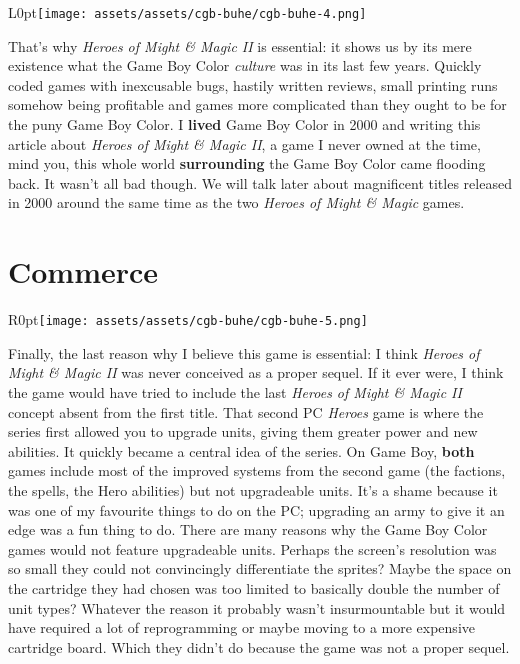 \documentclass{book}
\begin{document}
\begin{wrapfigure}{L}{0pt}{\texttt{[image: assets/assets/cgb-buhe/cgb-buhe-4.png]}}\end{wrapfigure}\noindent
That’s why \emph{Heroes of Might \& Magic II} is essential: it shows us by its mere existence what the Game Boy Color \emph{culture} was in its last few years. Quickly coded games with inexcusable bugs, hastily written reviews, small printing runs somehow being profitable and games more complicated than they ought to be for the puny Game Boy Color. I \textbf{lived} Game Boy Color in 2000 and writing this article about \emph{Heroes of Might \& Magic II}, a game I never owned at the time, mind you, this whole world \textbf{surrounding} the Game Boy Color came flooding back. It wasn’t all bad though. We will talk later about magnificent titles released in 2000 around the same time as the two \emph{Heroes of Might \& Magic} games.\par
\FloatBarrier\section*{Commerce}
\begin{wrapfigure}{R}{0pt}{\texttt{[image: assets/assets/cgb-buhe/cgb-buhe-5.png]}}\end{wrapfigure}
Finally, the last reason why I believe this game is essential: I think \emph{Heroes of Might \& Magic II} was never conceived as a proper sequel. If it ever were, I think the game would have tried to include the last \emph{Heroes of Might \& Magic II} concept absent from the first title. That second PC \emph{Heroes} game is where the series first allowed you to upgrade units, giving them greater power and new abilities. It quickly became a central idea of the series. On Game Boy, \textbf{both} games include most of the improved systems from the second game (the factions, the spells, the Hero abilities) but not upgradeable units. It’s a shame because it was one of my favourite things to do on the PC; upgrading an army to give it an edge was a fun thing to do. There are many reasons why the Game Boy Color games would not feature upgradeable units. Perhaps the screen’s resolution was so small they could not convincingly differentiate the sprites? Maybe the space on the cartridge they had chosen was too limited to basically double the number of unit types? Whatever the reason it probably wasn’t insurmountable but it would have required a lot of reprogramming or maybe moving to a more expensive cartridge board. Which they didn’t do because the game was not a proper sequel.\par
\end{document}
